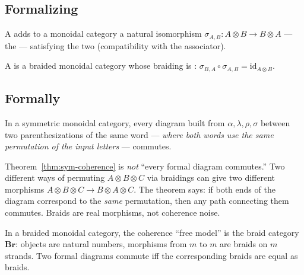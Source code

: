 \subsection{Formalizing}

\begin{definition}
\label{def:braided}
A  adds to a monoidal category a natural
isomorphism $\sigma_{A, B} : A \otimes B \to B \otimes A$ — the 
— satisfying the two  (compatibility with the
associator).
\end{definition}

\begin{definition}
A  is a braided monoidal category whose
braiding is : $\sigma_{B, A} \circ \sigma_{A, B} =
\mathrm{id}_{A \otimes B}$.
\end{definition}

\subsection{Formally}

\begin{theorem}
\label{thm:sym-coherence}
In a symmetric monoidal category, every diagram built from $\alpha, \lambda,
\rho, \sigma$ between two parenthesizations of the same word — \emph{where
both words use the same permutation of the input letters} — commutes.
\end{theorem}

\begin{remark}
Theorem~\ref{thm:sym-coherence} is \emph{not} ``every formal diagram
commutes.'' Two different ways of permuting $A \otimes B \otimes C$ via
braidings can give two different morphisms $A \otimes B \otimes C \to
B \otimes A \otimes C$. The theorem says: if both ends of the diagram
correspond to the \emph{same} permutation, then any path connecting them
commutes. Braids are real morphisms, not coherence noise.
\end{remark}

\begin{theorem}
\label{thm:braid-coherence}
In a braided monoidal category, the coherence ``free model'' is the braid
category $\mathbf{Br}$: objects are natural numbers, morphisms from $m$ to
$m$ are braids on $m$ strands. Two formal diagrams commute iff the
corresponding braids are equal as braids.
\end{theorem}

